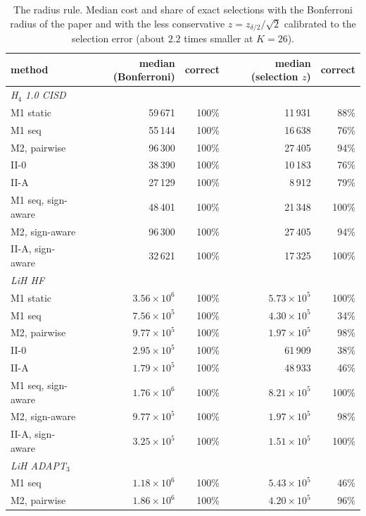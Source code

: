 \documentclass[aps,pra,reprint,superscriptaddress,nofootinbib]{revtex4-2}
\begin{document}
\begin{table}[!htb]
\centering\small
\caption{The radius rule. Median cost and share of exact selections with the Bonferroni radius of the paper and with the less conservative $z=z_{\delta/2}/\sqrt2$ calibrated to the selection error (about $2.2$ times smaller at $K=26$).}
\label{tab:radius}
\begin{tabular}{lrrrr}
\toprule
method & median (Bonferroni) & correct & median (selection $z$) & correct \\
\midrule
\multicolumn{5}{l}{\emph{H$_4$ 1.0 CISD}} \\
M1 static & 59\,671 & 100\% & 11\,931 & 88\% \\
M1 seq & 55\,144 & 100\% & 16\,638 & 76\% \\
M2, pairwise & 96\,300 & 100\% & 27\,405 & 94\% \\
II-0 & 38\,390 & 100\% & 10\,183 & 76\% \\
II-A & 27\,129 & 100\% & 8\,912 & 79\% \\
M1 seq, sign-aware & 48\,401 & 100\% & 21\,348 & 100\% \\
M2, sign-aware & 96\,300 & 100\% & 27\,405 & 94\% \\
II-A, sign-aware & 32\,621 & 100\% & 17\,325 & 100\% \\
\multicolumn{5}{l}{\emph{LiH HF}} \\
M1 static & $3.56\times10^{6}$ & 100\% & $5.73\times10^{5}$ & 100\% \\
M1 seq & $7.56\times10^{5}$ & 100\% & $4.30\times10^{5}$ & 34\% \\
M2, pairwise & $9.77\times10^{5}$ & 100\% & $1.97\times10^{5}$ & 98\% \\
II-0 & $2.95\times10^{5}$ & 100\% & 61\,909 & 38\% \\
II-A & $1.79\times10^{5}$ & 100\% & 48\,933 & 46\% \\
M1 seq, sign-aware & $1.76\times10^{6}$ & 100\% & $8.21\times10^{5}$ & 100\% \\
M2, sign-aware & $9.77\times10^{5}$ & 100\% & $1.97\times10^{5}$ & 98\% \\
II-A, sign-aware & $3.25\times10^{5}$ & 100\% & $1.51\times10^{5}$ & 100\% \\
\multicolumn{5}{l}{\emph{LiH ADAPT$_3$}} \\
M1 seq & $1.18\times10^{6}$ & 100\% & $5.43\times10^{5}$ & 46\% \\
M2, pairwise & $1.86\times10^{6}$ & 100\% & $4.20\times10^{5}$ & 96\% \\

\end{tabular}
\end{table}
\end{document}
